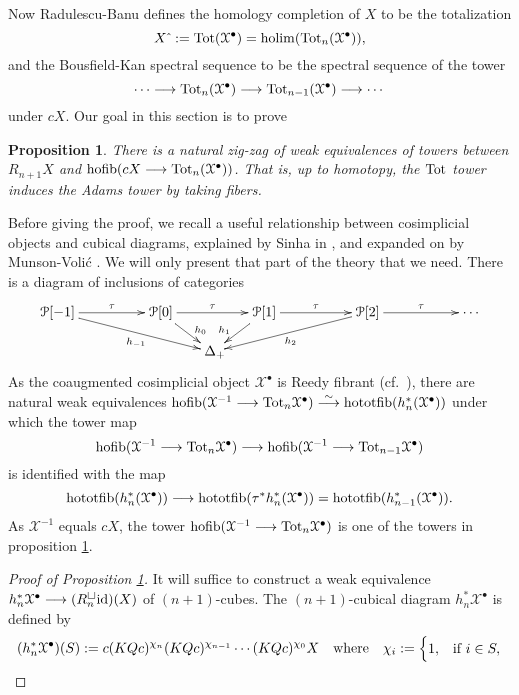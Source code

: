 \documentclass[11pt]{amsart}
\theoremstyle{plain}
\newtheorem{prop}[thm]{Proposition}
\theoremstyle{definition}
\DeclareMathOperator*{\holim}{holim}
\DeclareMathOperator*{\hofib}{hofib}
\renewcommand{\to}{\longrightarrow}
\newcommand{\calP}{\mathcal{P}}
\newcommand{\calX}{\mathcal{X}}
\theoremstyle{plain}
\newcommand{\Id}{\textup{id}}
\newcommand{\plainD}{R}
\begin{document}
\begin{Bousfield-Kan spectral sequence}
Now Radulescu-Banu defines the homology completion of $X$ to be the totalization
\[X\hat{\ }:=\textup{Tot}(\calX^\bullet)=\holim (\textup{Tot}_n(\calX^\bullet)),\]
and the Bousfield-Kan spectral sequence to be the spectral sequence of the tower
\[\cdots \to\textup{Tot}_n(\calX^\bullet)\to \textup{Tot}_{n-1}(\calX^\bullet)\to\cdots \]
under $cX$. Our goal in this section is to prove
\begin{prop}\label{towerIdentification}
There is a natural zig-zag of weak equivalences of towers between $\plainD_{n+1}X$ and $\hofib(cX\to\textup{Tot}_{n}(\calX^\bullet))$. That is, up to homotopy, the $\textup{Tot}$ tower induces the Adams tower by taking fibers.
\end{prop}
Before giving the proof, we recall a useful relationship between cosimplicial objects and cubical diagrams, explained by Sinha in \cite[Theorem 6.5]{SinhaSpacesOfKnots.pdf}, and expanded on by Munson-Voli\'c \cite{CubicalHomotopyTheory.pdf}.
We will only present that part of the theory that we need. There is a diagram of inclusions of categories
\[\xymatrix@!0@R=10mm@C=13mm{
\calP[-1]\ar[rr]^-{\tau}\ar_-{h_{-1}}[drrr]
&&%
\calP[0]\ar[rr]^-{\tau}\ar^(.65){\!h_{0}}[dr]
&&%
\calP[1]\ar[rr]^-{\tau}\ar_(.65){h_{1}\!}[dl]
&&%
\calP[2]\ar[rr]^-{\tau}\ar^-{h_{2}}[dlll]
&&%
\cdots \\
&&&\Delta_+\!\!
}\]
As the coaugmented cosimplicial object $\calX^\bullet$ is Reedy fibrant (cf.\ \cite[{X.4.9}]{YellowMonster}), there are natural weak equivalences $\hofib(\calX^{-1}\to\textup{Tot}_n\calX^\bullet) \overset{\smash{\sim}}{\to} \textup{hototfib}(h_n^*(\calX^\bullet))$ under which the tower map 
\[\hofib(\calX^{-1}\to\textup{Tot}_n\calX^\bullet)\to \hofib(\calX^{-1}\to\textup{Tot}_{n-1}\calX^\bullet)\]
is identified with the map
\[\textup{hototfib}(h_n^*(\calX^\bullet))\to \textup{hototfib}(\tau^*h_n^*(\calX^\bullet))=\textup{hototfib}(h_{n-1}^*(\calX^\bullet)).\]
As $\calX^{-1}$ equals $cX$, the tower $\hofib(\calX^{-1}\to\textup{Tot}_n\calX^{\bullet})$ is one of the towers in proposition \ref{towerIdentification}.
\begin{proof}[Proof of Proposition \ref{towerIdentification}] 
It will suffice to construct a weak equivalence $h_n^*\calX^\bullet\to (\plainD_n^{\smash{\square}}\Id  )(X)$ of $(n+1)$-cubes. The $(n+1)$-cubical diagram $h_n^*\calX^\bullet$ is defined by
\[(h_n^*\calX^\bullet)(S):= c(KQc)^{\chi_{n}}(KQc)^{\chi_{n-1}}\cdots (KQc)^{\chi_0}X\quad \textup{where}\quad \chi_i:=\begin{cases}
1,&\textup{if }i\in S,\\

\end{cases}\]
\end{proof}
\end{Bousfield-Kan spectral sequence}
\end{document}
